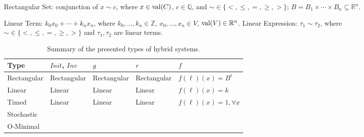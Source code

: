 Rectangular Set: conjunction of $x\sim c$, where $x\in \operatorname{val}(C)$, $c\in\mathbb{Q}$, and $\sim\in\{<,\leq,=,\geq,>\}$; $B=B_{1}\times\cdots\times B_{n}\subseteq \mathbb{R}^{n}$.

Linear Term: $k_{0}x_{0}+\cdots+k_{n}x_{n}$, where $k_{0},\ldots,k_{n}\in \mathbb{Z}$, $x_{0},\ldots,x_{n}\in V$, $\operatorname{val}(V)\in\mathbb{R}^{n}$.
Linear Expression: $\tau_{1}\sim\tau_{2}$, where $\sim\in\{<,\leq,=,\geq,>\}$ and $\tau_{1},\tau_{2}$ are linear terms.



\begin{table}
\begin{center}
\begin{tabular}{|l|l|l|l|l|}\hline
Type & $Init$, $Inv$ & $g$ & $r$ & $f$ \\ \hline
Rectangular & Rectangular & Rectangular & Rectangular & $f(\ell)(x) = B^{\ell}$ \\ \hline
Linear & Linear & Linear  & Linear  & $f(\ell)(x)=k$ \\ \hline
Timed & Linear & Linear & Linear & $f(\ell)(x)=1, \forall x$ \\ \hline
Stochastic &  &  &  & \\ \hline
O-Minimal &  &  &  & \\ \hline
\end{tabular}
\label{tab:hasummary}
\caption{Summary of the presented types of hybrid systems.}
\end{center}
\end{table}








